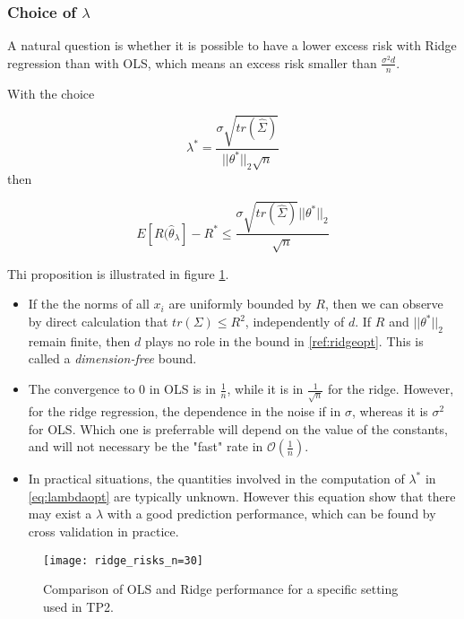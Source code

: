 \documentclass[
10pt, %
a4paper, %
oneside, %
headinclude,footinclude, %
BCOR5mm, %
]{scrartcl}
\begin{document}
\subsubsection{\large\color{Periwinkle}Choice of $\lambda$}

A natural question is whether it is possible to have a lower excess risk with Ridge regression than with OLS, which means an excess risk smaller than $ \frac{\sigma^2d}{n} $.

\begin{proposition}
    With the choice 

    \begin{equation}
	\label{eq:lambdaopt}
	\lambda^* = \frac{\sigma \sqrt{tr( \hat{\Sigma})}}{||\theta^*||_2 \sqrt{n} } 
    \end{equation}
    then

    \begin{equation}
	\label{ref:ridgeopt}
	E[ R( \hat{\theta}_{\lambda}]-R^*\leq \frac{\sigma \sqrt{tr( \hat{\Sigma})}||\theta^*||_2 }{ \sqrt{n} } 
    \end{equation}
\end{proposition}

Thi proposition is illustrated in figure \ref{fig:ridge_risks_n=30}.

\begin{itemize}
    \item If the the norms of all $x_i$ are uniformly bounded by $R$, then we can observe by direct calculation that $tr( \Sigma)\leq R^2$, independently of $d$. If $R$ and $||\theta^*||_2$ remain finite, then $d$ plays no role in  the bound in \ref{ref:ridgeopt}. This is called a \textit{{dimension-free}} bound.
    \item The convergence to $0$ in OLS is in $ \frac{1}{n} $, while it is  in $ \frac{1}{ \sqrt{n} }$ for the ridge. However, for the ridge regression, the dependence in the noise if in $\sigma$, whereas it is $\sigma^2$ for OLS. Which one is preferrable will depend on the value of the constants, and will not necessary be the "fast" rate in $ \mathcal{O} ( \frac{1}{n} )$.
    \item In practical situations, the quantities involved in the computation of $\lambda^*$ in  \ref{eq:lambdaopt} are typically unknown. However this equation show that there may exist a $\lambda$ with a good prediction performance, which can be found by cross validation in practice.
\end{itemize}

\begin{figure}[htpb]
    \centering
    \texttt{[image: ridge\_risks\_n=30]}
    \caption{Comparison of OLS and Ridge performance for a specific setting
    used in TP2.}
    \label{fig:ridge_risks_n=30}
\end{figure}
\end{document}
